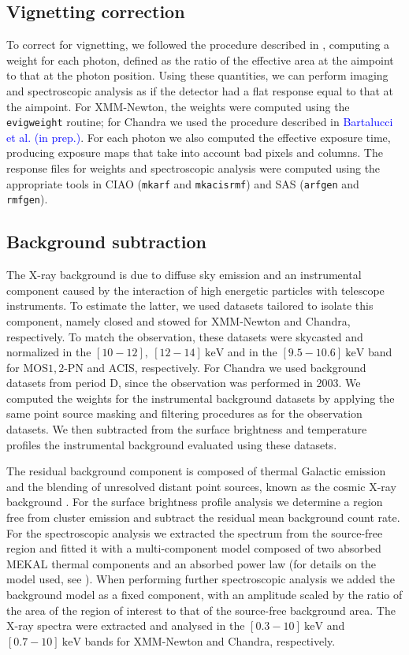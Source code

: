 \documentclass[twocolumn,traditabstract]{aa}
\begin{document}
\subsection{Vignetting correction}
To correct for vignetting, we followed the procedure described in \cite{arnaud2001}, computing a weight for each photon, defined as the ratio of the effective area at the aimpoint to that at the photon position. Using these quantities, we can perform imaging and spectroscopic analysis as if the detector had a flat response equal to that at the aimpoint. For XMM-Newton, the weights were computed using the \verb?evigweight? routine; for Chandra we used the procedure described in \textcolor{blue}{Bartalucci et al. (in prep.)}. For each photon we also computed the effective exposure time, producing exposure maps that take into account bad pixels and columns. The response files for weights and spectroscopic analysis were computed using the appropriate tools in CIAO (\verb?mkarf? and \verb?mkacisrmf?) and SAS (\verb?arfgen? and \verb?rmfgen?).

\subsection{Background subtraction}
The X-ray background is due to diffuse sky emission and an instrumental component caused by the interaction of high energetic particles with telescope instruments. To estimate the latter, we used datasets tailored to isolate this component, namely {\sc closed} and {\sc stowed}  for XMM-Newton and Chandra, respectively. To match the observation, these datasets were  skycasted and normalized in the $[10-12], \ [12-14] \ \si{\kilo\electronvolt}$ and in the $[9.5-10.6] \ \si{\kilo\electronvolt}$ band for MOS$1,2$-PN and ACIS, respectively. For Chandra we used background datasets from period D, since the observation was performed in 2003. We computed the weights for the instrumental background datasets by applying the same point source masking and filtering procedures as for the observation datasets. We then subtracted from the surface brightness and temperature profiles the instrumental background evaluated using these datasets.

The residual background component is composed of thermal Galactic emission \citep{snowden1995} and the blending of unresolved distant point sources, known as the cosmic X-ray background \citep{giacconi2001}. For the surface brightness profile analysis we determine a region free from cluster emission and subtract the residual mean background count rate. For the spectroscopic analysis we extracted the spectrum from the source-free region and fitted it with a multi-component model composed of two absorbed {\sc MEKAL} thermal components and an absorbed power law (for details on the model used, see \citealt{pratt2009}). When performing further spectroscopic analysis we added the background model as a fixed component, with an amplitude scaled by the ratio of the area of the region of interest to that of the source-free background area. The X-ray spectra were extracted and analysed in the $[0.3-10] \ \si{\kilo\electronvolt}$ and $[0.7-10] \ \si{\kilo\electronvolt}$ bands for XMM-Newton and Chandra, respectively. 
\end{document}
